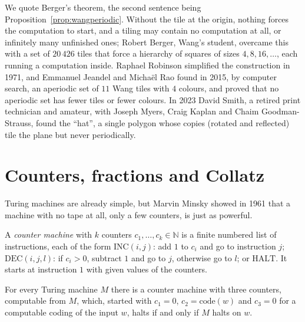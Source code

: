 We quote Berger's theorem, the second sentence being Proposition~\ref{prop:wangperiodic}. Without the tile at the origin, nothing forces the computation to start, and a tiling may contain no computation at all, or infinitely many unfinished ones; Robert Berger, Wang's student, overcame this with a set of $20\,426$ tiles that force a hierarchy of squares of sizes $4,8,16,\dots$, each running a computation inside. Raphael Robinson simplified the construction in 1971, and Emmanuel Jeandel and Michaël Rao found in 2015, by computer search, an aperiodic set of $11$ Wang tiles with $4$ colours, and proved that no aperiodic set has fewer tiles or fewer colours. In 2023 David Smith, a retired print technician and amateur, with Joseph Myers, Craig Kaplan and Chaim Goodman-Strauss, found the ``hat'', a single polygon whose copies (rotated and reflected) tile the plane but never periodically.

\section{Counters, fractions and Collatz}\label{sec:fractran}

Turing machines are already simple, but Marvin Minsky showed in 1961 that a machine with no tape at all, only a few counters, is just as powerful.

\begin{definition}\label{def:counter}
A \emph{counter machine} with $k$ counters $c_1,\dots,c_k\in\mathbb N$ is a finite numbered list of instructions, each of the form $\mathrm{INC}(i,j)$: add $1$ to $c_i$ and go to instruction $j$; $\mathrm{DEC}(i,j,l)$: if $c_i>0$, subtract $1$ and go to $j$, otherwise go to $l$; or $\mathrm{HALT}$. It starts at instruction $1$ with given values of the counters.
\end{definition}

\begin{theorem}[Minsky, 1961]\label{thm:minsky}
For every Turing machine $M$ there is a counter machine with three counters, computable from $M$, which, started with $c_1=0$, $c_2=\mathrm{code}(w)$ and $c_3=0$ for a computable coding of the input $w$, halts if and only if $M$ halts on $w$.
\end{theorem}

